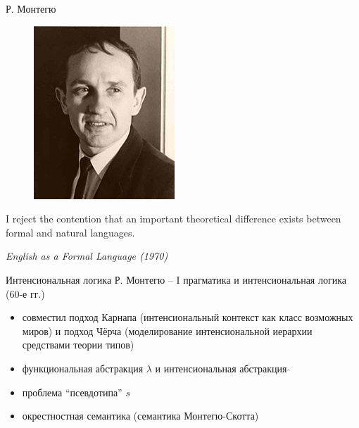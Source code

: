 \documentclass{beamer}
\begin{document}
\begin{frame}{Р. Монтегю}
\begin{center}
	\begin{figure}[H]
		\includegraphics[scale=0.5]{montague.jpg} 
	\end{figure}
\end{center}
\begin{flushleft}
I reject the contention that an important theoretical difference exists between formal and natural languages.
\end{flushleft}
\begin{flushright}
\textit{English as a Formal Language (1970)}
\end{flushright}
\end{frame}

\begin{frame}{Интенсиональная логика Р. Монтегю -- I}
прагматика и интенсиональная логика (60-е гг.)\\
\bigskip
\begin{itemize}
    \item совместил подход Карнапа (интенсиональный контекст как класс возможных миров) и подход Чёрча (моделирование интенсиональной иерархии средствами теории типов)
    \item функциональная абстракция $\lambda$ и интенсиональная абстракция $\hat{}$
    \item проблема ``псевдотипа'' $s$
    \item окрестностная семантика (семантика Монтегю-Скотта)
\end{itemize}
\end{frame}
\end{document}
